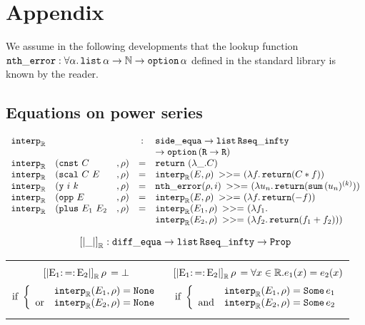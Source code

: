 \newpage{}
\section{Appendix}

We assume in the following developments that the lookup function
$\ntherr : \forall \alpha. \alist{} \alpha \rightarrow \N \rightarrow \option{}
\alpha$ defined in the standard library is known by the reader.

\subsection{Equations on power series}

\label{interpR}

$$\begin{array}{lllcl}
\IR & & & : & \se \rightarrow \alist{} \mathtt{Rseq\_infty} \\
    & & &   & \rightarrow \option{} (\texttt{R} \rightarrow \texttt{R}) \\
\IR & (\mathtt{cnst}~ C & , \rho) & = & \return~ (\lambda \_.C)\\
\IR & (\mathtt{scal}~ C ~ E &, \rho) & = & \IR(E, \rho) \bind (\lambda f. \return (C * f))\\
\IR & (\mathtt{y} ~ i ~ k &, \rho) & = & \ntherr(\rho, i) \bind (\lambda u_n. \return (\Psum{}(u_n)^{(k)})) \\
\IR & (\mathtt{opp} ~E &, \rho) & = & \IR(E,\rho) \bind (\lambda f. \return (- f))\\
\IR & (\mathtt{plus} ~ E_1 ~ E_2 &, \rho) & = & \IR(E_1,\rho) \bind (\lambda f_1.\\
    & & &   & \IR(E_2,\rho) \bind (\lambda f_2. \return (f_1 + f_2)))\\
\end{array}$$


$$\left[\left| \_ \right|\right]_{\R} : \de \rightarrow \alist{}
\mathtt{Rseq\_infty} \rightarrow \Prop$$

\begin{center}
\begin{tabular}{c|c}
\begin{minipage}{0.45\textwidth}
$$\SemR{} = \bot$$
$$ \text{if } \left\lbrace
\begin{array}{ll}
& \IR(E_1, \rho) = \None\\
\text{or} & \IR(E_2, \rho) = \None
\end{array}\right.$$
\end{minipage}

& \begin{minipage}{0.45\textwidth}
$$\SemR{} = \forall x \in \R. e_1(x) = e_2(x)$$
$$\text{if } \left\lbrace
\begin{array}{ll}
& \IR(E_1, \rho) = \Some e_1\\
\text{and} & \IR(E_2, \rho) = \Some e_2
\end{array}\right.$$
\end{minipage}

\end{tabular}
\end{center}
